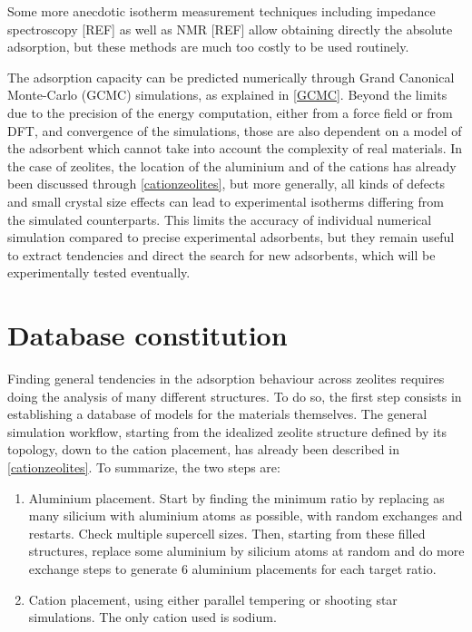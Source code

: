 \documentclass[main.tex]{subfiles}
\begin{document}
Some more anecdotic isotherm measurement techniques including impedance spectroscopy [REF] as well as NMR [REF] allow obtaining directly the absolute adsorption, but these methods are much too costly to be used routinely.

The adsorption capacity can be predicted numerically through Grand Canonical Monte-Carlo (GCMC) simulations, as explained in \cref{GCMC}. Beyond the limits due to the precision of the energy computation, either from a force field or from DFT, and convergence of the simulations, those are also dependent on a model of the adsorbent which cannot take into account the complexity of real materials. In the case of zeolites, the location of the aluminium and of the cations has already been discussed through \cref{cationzeolites}, but more generally, all kinds of defects and small crystal size effects can lead to experimental isotherms differing from the simulated counterparts. This limits the accuracy of individual numerical simulation compared to precise experimental adsorbents, but they remain useful to extract tendencies and direct the search for new adsorbents, which will be experimentally tested eventually.

\section{Database constitution}

Finding general tendencies in the adsorption behaviour across zeolites requires doing the analysis of many different structures. To do so, the first step consists in establishing a database of models for the materials themselves. The general simulation workflow, starting from the idealized zeolite structure defined by its topology, down to the cation placement, has already been described in \cref{cationzeolites}. To summarize, the two steps are:
\begin{enumerate}
	\item Aluminium placement. Start by finding the minimum \SiAl ratio by replacing as many silicium with aluminium atoms as possible, with random exchanges and restarts. Check multiple supercell sizes. Then, starting from these filled structures, replace some aluminium by silicium atoms at random and do more exchange steps to generate 6 aluminium placements for each target \SiAl ratio.
	\item Cation placement, using either parallel tempering or shooting star simulations. The only cation used is sodium.
\end{enumerate}
\end{document}
